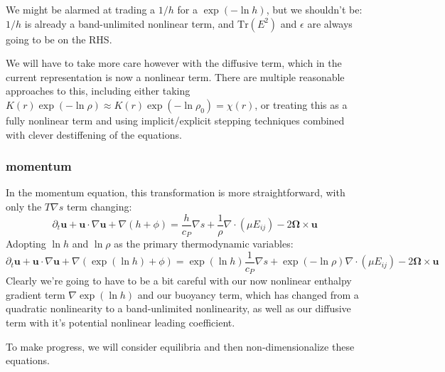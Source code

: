 \documentclass{aastex631}
\newcommand{\del}{\nabla}
\renewcommand{\vec}{\boldsymbol}
\begin{document}
We might be alarmed at trading a $1/h$ for a $\exp{(-\ln h)}$, but we shouldn't be: $1/h$ is already a band-unlimited nonlinear term, and $\mathrm{Tr}(E^2)$ and $\epsilon$ are always going to be on the RHS.

We will have to take more care however with the diffusive term, which in the current representation is now a nonlinear term.  There are multiple reasonable approaches to this, including either taking $K(r) \exp(-\ln \rho) \approx K(r) \exp(-\ln \rho_0) = \chi(r)$, or treating this as a fully nonlinear term and using implicit/explicit stepping techniques combined with clever destiffening of the equations.

\subsubsection{momentum}
In the momentum equation, this transformation is more straightforward, with only the $T\del s$ term changing:
\begin{equation}
  \partial_t \vec{u} + \vec{u}\cdot \del \vec{u} + \del (h + \phi) = \frac{h}{c_P}\del s + \frac{1}{\rho}\del\cdot (\mu E_{ij}) - 2 \vec{\Omega} \times \vec{u}
\end{equation}
Adopting $\ln h$ and $\ln \rho$ as the primary thermodynamic variables:
\begin{equation}
  \partial_t \vec{u} + \vec{u}\cdot \del \vec{u} + \del (\exp(\ln h) + \phi) = \exp(\ln h)\frac{1}{c_P}\del s + \exp(-\ln\rho)\del\cdot (\mu E_{ij}) - 2 \vec{\Omega} \times \vec{u}
\end{equation}
Clearly we're going to have to be a bit careful with our now nonlinear enthalpy gradient term $\del \exp(\ln h)$ and our buoyancy term, which has changed from a quadratic nonlinearity to a band-unlimited nonlinearity, as well as our diffusive term with it's potential nonlinear leading coefficient.

To make progress, we will consider equilibria and then non-dimensionalize these equations.
\end{document}
